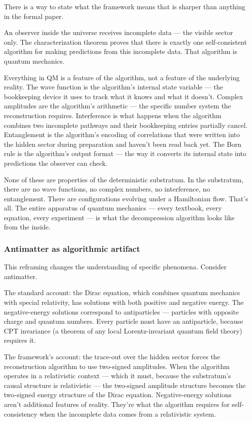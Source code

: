 \documentclass[
]{article}
\begin{document}
There is a way to state what the framework means that is sharper than
anything in the formal paper.

An observer inside the universe receives incomplete data --- the visible
sector only. The characterization theorem proves that there is exactly
one self-consistent algorithm for making predictions from this
incomplete data. That algorithm is quantum mechanics.

Everything in QM is a feature of the algorithm, not a feature of the
underlying reality. The wave function is the algorithm's internal state
variable --- the bookkeeping device it uses to track what it knows and
what it doesn't. Complex amplitudes are the algorithm's arithmetic ---
the specific number system the reconstruction requires. Interference is
what happens when the algorithm combines two incomplete pathways and
their bookkeeping entries partially cancel. Entanglement is the
algorithm's encoding of correlations that were written into the hidden
sector during preparation and haven't been read back yet. The Born rule
is the algorithm's output format --- the way it converts its internal
state into predictions the observer can check.

None of these are properties of the deterministic substratum. In the
substratum, there are no wave functions, no complex numbers, no
interference, no entanglement. There are configurations evolving under a
Hamiltonian flow. That's all. The entire apparatus of quantum mechanics
--- every textbook, every equation, every experiment --- is what the
decompression algorithm looks like from the inside.

\hypertarget{antimatter-as-algorithmic-artifact}{%
\subsubsection{Antimatter as algorithmic
artifact}\label{antimatter-as-algorithmic-artifact}}

This reframing changes the understanding of specific phenomena. Consider
antimatter.

The standard account: the Dirac equation, which combines quantum
mechanics with special relativity, has solutions with both positive and
negative energy. The negative-energy solutions correspond to
antiparticles --- particles with opposite charge and quantum numbers.
Every particle must have an antiparticle, because CPT invariance (a
theorem of any local Lorentz-invariant quantum field theory) requires
it.

The framework's account: the trace-out over the hidden sector forces the
reconstruction algorithm to use two-signed amplitudes. When the
algorithm operates in a relativistic context --- which it must, because
the substratum's causal structure is relativistic --- the two-signed
amplitude structure becomes the two-signed energy structure of the Dirac
equation. Negative-energy solutions aren't additional features of
reality. They're what the algorithm requires for self-consistency when
the incomplete data comes from a relativistic system.
\end{document}
